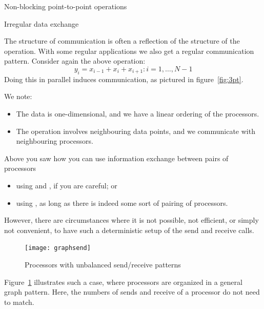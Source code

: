 
 {Non-blocking point-to-point operations}

 {Irregular data exchange}

The structure of communication is often a reflection of the structure
of the operation.
With some regular applications we also get a regular communication pattern.
Consider again the above operation:
\[ y_i=x_{i-1}+x_i+x_{i+1}\colon i=1,\ldots,N-1 \]
Doing this in parallel induces communication, as pictured in figure~\ref{fig:3pt}.


We note:
\begin{itemize}
\item The data is one-dimensional, and we have a linear ordering of the processors.
\item The operation involves neighbouring data points, and we communicate
  with neighbouring processors.
\end{itemize}

Above you saw how you can use information exchange between pairs of processors
\begin{itemize}
\item using  and , if you are careful; or
\item using , as long as there is indeed some sort of pairing of processors.
\end{itemize}
However, there are circumstances where it is not possible, not efficient, or simply not
convenient, to have such a deterministic setup of the send and receive calls.
%
\begin{figure}
  \texttt{[image: graphsend]}
  \caption{Processors with unbalanced send/receive patterns}
  \label{fig:graphsend}
\end{figure}
%
Figure~\ref{fig:graphsend} illustrates such a case, where processors are
organized in a general graph pattern. Here, the numbers of sends and receive
of a processor do not need to match.

